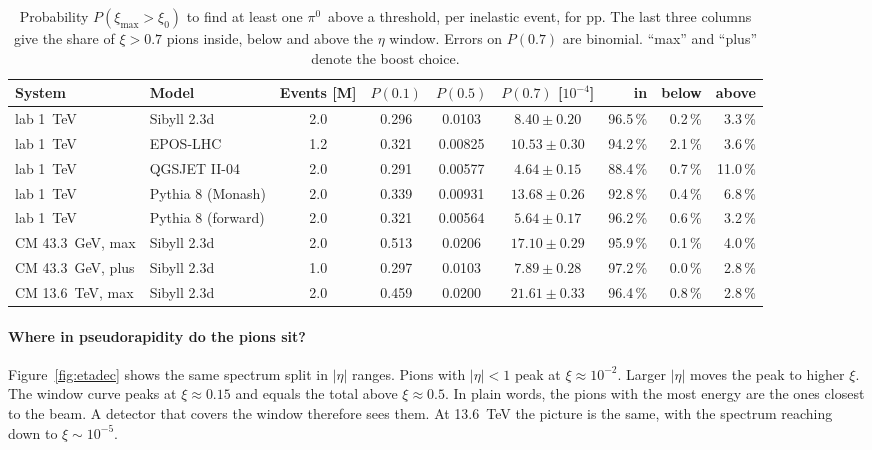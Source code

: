 \documentclass[11pt,a4paper]{article}
\newcommand{\pizero}{\ensuremath{\pi^{0}}}
\begin{document}
\begin{table}[!htbp]
\centering
\small
\caption{Probability $P(\xi_{\max}>\xi_0)$ to find at least one \pizero\ above a threshold, per inelastic event, for pp. The last three columns give the share of $\xi>0.7$ pions inside, below and above the $\eta$ window. Errors on $P(0.7)$ are binomial. ``max'' and ``plus'' denote the boost choice.}
\label{tab:pp}
\setlength{\tabcolsep}{3pt}
\begin{tabular}{@{}llccccrrr@{}}
\toprule
System & Model & Events [M] & $P(0.1)$ & $P(0.5)$ & $P(0.7)$ [$10^{-4}$] & in & below & above\\
\midrule
lab 1~TeV & Sibyll 2.3d & 2.0 & 0.296 & 0.0103 & $8.40\pm0.20$ & 96.5\,\% & 0.2\,\% & 3.3\,\%\\
lab 1~TeV & EPOS-LHC & 1.2 & 0.321 & 0.00825 & $10.53\pm0.30$ & 94.2\,\% & 2.1\,\% & 3.6\,\%\\
lab 1~TeV & QGSJET II-04 & 2.0 & 0.291 & 0.00577 & $4.64\pm0.15$ & 88.4\,\% & 0.7\,\% & 11.0\,\%\\
lab 1~TeV & Pythia 8 (Monash) & 2.0 & 0.339 & 0.00931 & $13.68\pm0.26$ & 92.8\,\% & 0.4\,\% & 6.8\,\%\\
lab 1~TeV & Pythia 8 (forward) & 2.0 & 0.321 & 0.00564 & $5.64\pm0.17$ & 96.2\,\% & 0.6\,\% & 3.2\,\%\\
CM 43.3~GeV, max & Sibyll 2.3d & 2.0 & 0.513 & 0.0206 & $17.10\pm0.29$ & 95.9\,\% & 0.1\,\% & 4.0\,\%\\
CM 43.3~GeV, plus & Sibyll 2.3d & 1.0 & 0.297 & 0.0103 & $7.89\pm0.28$ & 97.2\,\% & 0.0\,\% & 2.8\,\%\\
CM 13.6~TeV, max & Sibyll 2.3d & 2.0 & 0.459 & 0.0200 & $21.61\pm0.33$ & 96.4\,\% & 0.8\,\% & 2.8\,\%\\
\bottomrule
\end{tabular}
\end{table}

\paragraph{Where in pseudorapidity do the pions sit?}
Figure~\ref{fig:etadec} shows the same spectrum split in $|\eta|$ ranges.
Pions with $|\eta|<1$ peak at $\xi\approx10^{-2}$.
Larger $|\eta|$ moves the peak to higher $\xi$.
The window curve peaks at $\xi\approx0.15$ and equals the total above $\xi\approx0.5$.
In plain words, the pions with the most energy are the ones closest to the beam.
A detector that covers the window therefore sees them.
At 13.6~TeV the picture is the same, with the spectrum reaching down to $\xi\sim10^{-5}$.
\end{document}
